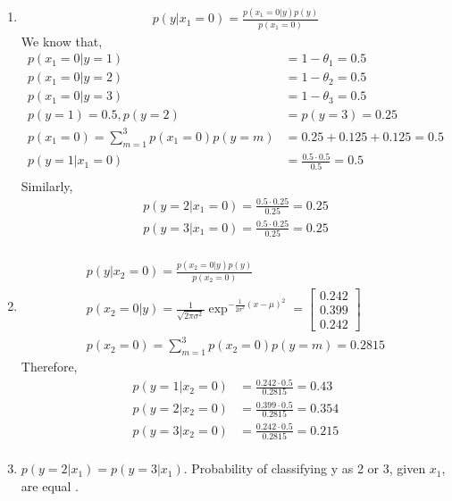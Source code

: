 \begin{enumerate}
	
	\item 
	
		\begin{align*}
			p(y | x_{1} = 0) = \frac{p(x_{1} = 0 | y)p(y)}{p(x_{1} = 0 )}
		\end{align*}
		We know that,		
		\begin{align*}
			p(x_{1} = 0 | y = 1) & = 1 - \theta_{1} = 0.5 \\
			p(x_{1} = 0 | y = 2) & = 1 - \theta_{2} = 0.5 \\
			p(x_{1} = 0 | y = 3) & = 1 - \theta_{3} = 0.5 \\
			p(y = 1) = 0.5, p(y = 2) & = p(y = 3) = 0.25 \\
			p(x_{1} = 0) = \sum_{m=1}^{3}p(x_{1} = 0)p(y=m) & = 0.25 + 0.125 + 0.125 = 0.5 \\
			p(y = 1 | x_{1} = 0) & = \frac{0.5 \cdot 0.5}{0.5} = 0.5 \\
		\end{align*}
		Similarly,
		\begin{align*}
			p(y = 2 | x_{1} = 0) = \frac{0.5 \cdot 0.25}{0.25} = 0.25 \\
			p(y = 3 | x_{1} = 0) = \frac{0.5 \cdot 0.25}{0.25} =  0.25 \\
		\end{align*}
		
	\item 
		
		\begin{align*}
			p(y | x_{2} = 0) = \frac{p(x_{2} = 0 | y)p(y)}{p(x_{2} = 0 )} \\
			p(x_{2} = 0 | y) = \frac{1}{\sqrt{2\pi\sigma^{2}}}\exp^{-\frac{1}{2\sigma^{2}}(x - \mu)^{2}} = \begin{bmatrix}
				0.242 \\ 0.399 \\ 0.242
			\end{bmatrix} \\
			p(x_{2} = 0) = \sum_{m=1}^{3}p(x_{2} = 0)p(y=m) = 0.2815
		\end{align*}
		Therefore,
		\begin{align*}
			p(y = 1 | x_{2} = 0) & = \frac{0.242 \cdot 0.5}{0.2815} = 0.43 \\
			p(y = 2 | x_{2} = 0) & = \frac{0.399 \cdot 0.5}{0.2815} = 0.354 \\
			p(y = 3 | x_{2} = 0) & = \frac{0.242 \cdot 0.5}{0.2815} = 0.215 \\
		\end{align*}
	
	\item $p(y = 2 | x_{1})  = p(y = 3 | x_{1})$. Probability of classifying y as 2 or 3, given $x_{1}$, are equal .
	

\end{enumerate}

